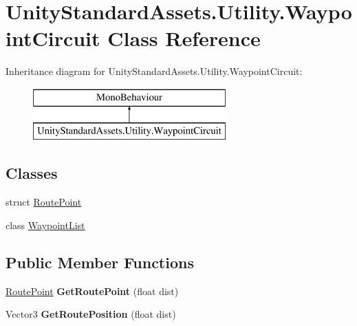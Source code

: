 \hypertarget{class_unity_standard_assets_1_1_utility_1_1_waypoint_circuit}{}\section{Unity\+Standard\+Assets.\+Utility.\+Waypoint\+Circuit Class Reference}
\label{class_unity_standard_assets_1_1_utility_1_1_waypoint_circuit}
Inheritance diagram for Unity\+Standard\+Assets.\+Utility.\+Waypoint\+Circuit\+:\begin{figure}[H]
\begin{center}
\leavevmode
\includegraphics[height=2.000000cm]{class_unity_standard_assets_1_1_utility_1_1_waypoint_circuit}
\end{center}
\end{figure}
\subsection*{Classes}
\begin{DoxyCompactItemize}
\item 
struct \hyperlink{struct_unity_standard_assets_1_1_utility_1_1_waypoint_circuit_1_1_route_point}{Route\+Point}
\item 
class \hyperlink{class_unity_standard_assets_1_1_utility_1_1_waypoint_circuit_1_1_waypoint_list}{Waypoint\+List}
\end{DoxyCompactItemize}
\subsection*{Public Member Functions}
\begin{DoxyCompactItemize}
\item 
\hyperlink{struct_unity_standard_assets_1_1_utility_1_1_waypoint_circuit_1_1_route_point}{Route\+Point} {\bfseries Get\+Route\+Point} (float dist)\hypertarget{class_unity_standard_assets_1_1_utility_1_1_waypoint_circuit_aac0437d6b641a9dd1cb32db4170a115f}{}\label{class_unity_standard_assets_1_1_utility_1_1_waypoint_circuit_aac0437d6b641a9dd1cb32db4170a115f}

\item 
Vector3 {\bfseries Get\+Route\+Position} (float dist)\hypertarget{class_unity_standard_assets_1_1_utility_1_1_waypoint_circuit_a7f3f7803b415864a93ae5c51829a2bcd}{}\label{class_unity_standard_assets_1_1_utility_1_1_waypoint_circuit_a7f3f7803b415864a93ae5c51829a2bcd}

\end{DoxyCompactItemize}
